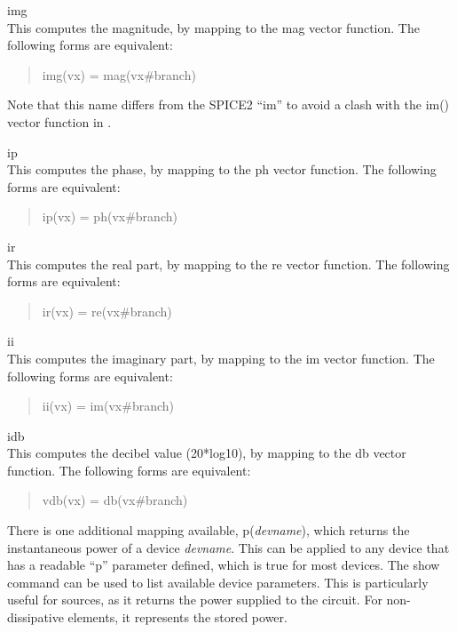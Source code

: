 \begin{description}
\item{\vt img}\\
This computes the magnitude, by mapping to the {\vt mag} vector
function.  The following forms are equivalent:
\begin{quote}\vt
img(vx) = mag(vx\#branch)
\end{quote}
Note that this name differs from the SPICE2 ``{\vt im}'' to avoid
a clash with the {\vt im()} vector function in {\WRspice}.

\item{\vt ip}\\
This computes the phase, by mapping to the {\vt ph} vector
function.  The following forms are equivalent:
\begin{quote}\vt
ip(vx) = ph(vx\#branch)
\end{quote}

\item{\vt ir}\\
This computes the real part, by mapping to the {\vt re} vector
function.  The following forms are equivalent:
\begin{quote}\vt
ir(vx) = re(vx\#branch)
\end{quote}

\item{\vt ii}\\
This computes the imaginary part, by mapping to the {\vt im} vector
function.  The following forms are equivalent:
\begin{quote}\vt
ii(vx) = im(vx\#branch)
\end{quote}

\item{\vt idb}\\
This computes the decibel value (20*log10), by mapping to the
{\vt db} vector function.  The following forms are equivalent:
\begin{quote}\vt
vdb(vx) = db(vx\#branch)
\end{quote}
\end{description}

There is one additional mapping available, {\vt p}({\it devname\/}),
which returns the instantaneous power of a device {\it devname\/}. 
This can be applied to any device that has a readable ``{\vt p}''
parameter defined, which is true for most devices.  The {\cb show}
command can be used to list available device parameters.  This is
particularly useful for sources, as it returns the power supplied to
the circuit.  For non-dissipative elements, it represents the stored
power.

